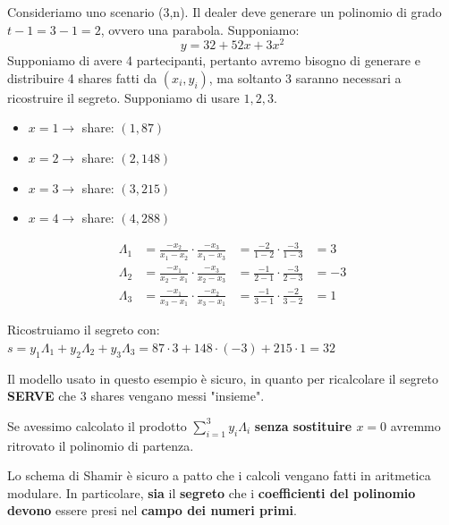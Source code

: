 \begin{example}
\label{exam:shamirex}
Consideriamo uno scenario (3,n). Il dealer deve generare un polinomio di grado $t-1=3-1=2$, ovvero una parabola. Supponiamo: \[y=32+52x+3x^2\]
Supponiamo di avere 4 partecipanti, pertanto avremo bisogno di generare e distribuire 4 shares fatti da $(x_i, y_i)$, ma soltanto 3 saranno necessari a ricostruire il segreto. Supponiamo di usare $1,2,3$.
\begin{multicols}{2}
    \begin{itemize}
    \item $x=1\rightarrow$ share: $(1,87)$
    \item $x=2\rightarrow$ share: $(2,148)$
    \item $x=3\rightarrow$ share: $(3,215)$
    \item $x=4\rightarrow$ share: $(4,288)$
\end{itemize}
\columnbreak
\begin{equation*}
\begin{aligned}
\Lambda_1&=\frac{-x_2}{x_1-x_2}\cdot\frac{-x_3}{x_1-x_3}&=\frac{-2}{1-2}\cdot\frac{-3}{1-3}&=3\\
\Lambda_2&=\frac{-x_1}{x_2-x_1}\cdot\frac{-x_3}{x_2-x_3}&=\frac{-1}{2-1}\cdot\frac{-3}{2-3}&=-3\\
\Lambda_3&=\frac{-x_1}{x_3-x_1}\cdot\frac{-x_2}{x_3-x_1}&=\frac{-1}{3-1}\cdot\frac{-2}{3-2}&=1
\end{aligned}    
\end{equation*}
\end{multicols}
Ricostruiamo il segreto con: $s=y_1\Lambda_1+y_2\Lambda_2+y_3\Lambda_3=87\cdot3+148\cdot(-3)+215\cdot1=32$
\begin{remark}
Il modello usato in questo esempio è sicuro, in quanto per ricalcolare il segreto \textbf{SERVE} che 3 shares vengano messi "insieme".
\end{remark}
\begin{remark}
Se avessimo calcolato il prodotto $\sum_{i=1}^3y_i\Lambda_i$ \textbf{senza sostituire $x=0$} avremmo ritrovato il polinomio di partenza.
\end{remark}
\end{example}
\begin{proposition}\label{prop:shamirsecurity}
Lo schema di Shamir è sicuro a patto che i calcoli vengano fatti in aritmetica modulare. In particolare, \textbf{sia} il \textbf{segreto} che i \textbf{coefficienti del polinomio} \textbf{devono} essere presi nel \textbf{campo dei numeri primi}.\footnotemark
{}
\end{proposition}
